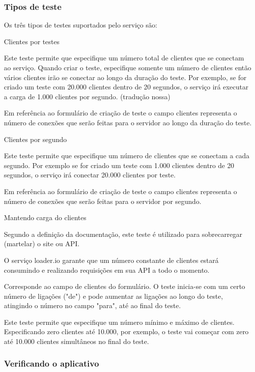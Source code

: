 \subsubsection{Tipos de teste}
  
  Os três tipos de testes suportados pelo serviço são:
  
  Clientes por testes
  
  Este teste permite que especifique um número total de clientes que se conectam ao serviço. Quando criar o teste,
  especifique somente um número de clientes então vários clientes irão se conectar ao longo da duração do teste. 
  Por exemplo, se for criado um teste com 20.000 clientes dentro de 20 segundos, o serviço irá executar a carga de 
  1.000 clientes por segundo. (tradução nossa)
  
  Em referência ao formulário de criação de teste o campo clientes representa o número de conexões que serão
  feitas para o servidor ao longo da duração do teste.
  
  Clientes por segundo
  
  Este teste permite que especifique um número de clientes que se conectam a cada segundo. Por exemplo se for criado
  um teste com 1.000 clientes dentro de 20 segundos, o serviço irá conectar 20.000 clientes por teste.
  
  Em referência ao formulário de criação de teste o campo clientes representa o número de conexões que serão
  feitas para o servidor por segundo.
  
  Mantendo carga do clientes
  
  Segundo a definição da documentação, este teste é utilizado para sobrecarregar (martelar) o site ou \ac{API}.
  
  O serviço loader.io garante que um número constante de clientes estará consumindo e realizando requisições em 
  sua \ac{API} a todo o momento.
  
  Corresponde ao campo de clientes do formulário. O teste inicia-se com um certo número de ligações ("de") 
  e pode aumentar as ligações ao longo do teste, atingindo o número no campo "para", até ao final do teste. 
  
  Este teste permite que especifique um número mínimo e máximo de clientes. Especificando zero clientes
  até 10.000, por exemplo, o teste vai começar com zero até 10.000 clientes simultâneos no final do teste.
  
\subsubsection{Verificando o aplicativo}

